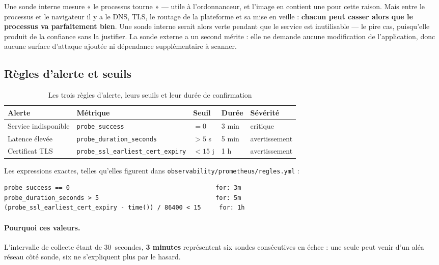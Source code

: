 \documentclass[11pt,a4paper]{article}
\newcommand{\code}[1]{{\shorthandoff{:;!?}\texttt{#1}}}
\begin{document}
Une sonde interne mesure « le processus tourne » — utile à l'ordonnanceur,
et l'image en contient une pour cette raison. Mais entre le processus et le
navigateur il y a le DNS, TLS, le routage de la plateforme et sa mise en
veille : \textbf{chacun peut casser alors que le processus va parfaitement
bien}. Une sonde interne serait alors verte pendant que le service est
inutilisable — le pire cas, puisqu'elle produit de la confiance sans la
justifier. La sonde externe a un second mérite : elle ne demande aucune
modification de l'application, donc aucune surface d'attaque ajoutée ni
dépendance supplémentaire à scanner.

\subsection{Règles d'alerte et seuils}

\begin{table}[htbp]
\centering
\small
\begin{tabular}{@{}l l l l l@{}}
\toprule
\textbf{Alerte} & \textbf{Métrique} & \textbf{Seuil} & \textbf{Durée} & \textbf{Sévérité} \\
\midrule
Service indisponible & \texttt{probe\_success}     & $= 0$        & 3 min & critique \\
Latence élevée       & \texttt{probe\_duration\_seconds} & $> 5$ s & 5 min & avertissement \\
Certificat TLS       & \texttt{probe\_ssl\_earliest\_cert\_expiry} & $< 15$ j & 1 h & avertissement \\
\bottomrule
\end{tabular}
\caption{Les trois règles d'alerte, leurs seuils et leur durée de confirmation}
\end{table}

Les expressions exactes, telles qu'elles figurent dans
\code{observability/prometheus/regles.yml} :

\begin{lstlisting}
probe_success == 0                                        for: 3m
probe_duration_seconds > 5                                for: 5m
(probe_ssl_earliest_cert_expiry - time()) / 86400 < 15     for: 1h
\end{lstlisting}

\paragraph{Pourquoi ces valeurs.} L'intervalle de collecte étant de
30~secondes, \textbf{3 minutes} représentent six sondes consécutives en
échec : une seule peut venir d'un aléa réseau côté sonde, six ne s'expliquent
plus par le hasard.
\end{document}
